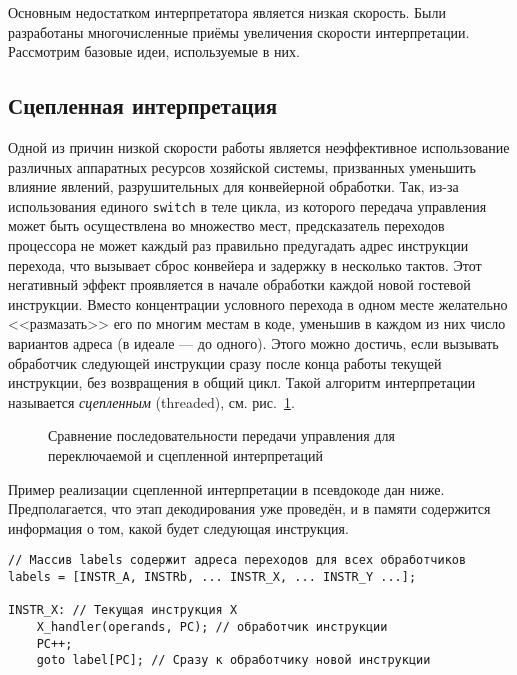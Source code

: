 Основным недостатком интерпретатора является низкая скорость. Были разработаны многочисленные приёмы увеличения скорости интерпретации. Рассмотрим базовые идеи, используемые в них.

\subsection{Сцепленная интерпретация}

Одной из причин низкой скорости работы является неэффективное использование различных аппаратных ресурсов хозяйской системы, призванных уменьшить влияние явлений, разрушительных для конвейерной обработки. Так, из-за использования единого \texttt{switch} в теле цикла, из которого передача управления может быть осуществлена  во множество мест, предсказатель переходов процессора не может каждый раз правильно предугадать адрес инструкции перехода, что вызывает сброс конвейера и задержку в несколько тактов. Этот негативный эффект проявляется в начале обработки каждой новой гостевой инструкции. Вместо концентрации условного перехода в одном месте  желательно <<размазать>> его по многим местам в коде, уменьшив в каждом из них число вариантов адреса (в идеале --- до одного). Этого можно достичь, если вызывать обработчик следующей инструкции сразу после конца работы текущей инструкции, без возвращения в общий цикл. Такой алгоритм интерпретации называется \textit{сцепленным} (\abbr threaded), см. рис.~\ref{fig:switched-threaded-interp}. 

\begin{figure}[htb]
    \centering
    \caption{Сравнение последовательности передачи управления для переключаемой и сцепленной интерпретаций}
    \label{fig:switched-threaded-interp}
\end{figure}


Пример реализации сцепленной интерпретации в псевдокоде дан ниже. Предполагается, что этап декодирования уже проведён, и в памяти содержится информация о том, какой будет следующая инструкция.

\begin{lstlisting}
// Массив labels содержит адреса переходов для всех обработчиков
labels = [INSTR_A, INSTRb, ... INSTR_X, ... INSTR_Y ...]; 

INSTR_X: // Текущая инструкция X
    X_handler(operands, PC); // обработчик инструкции
    PC++;
    goto label[PC]; // Сразу к обработчику новой инструкции
\end{lstlisting}

